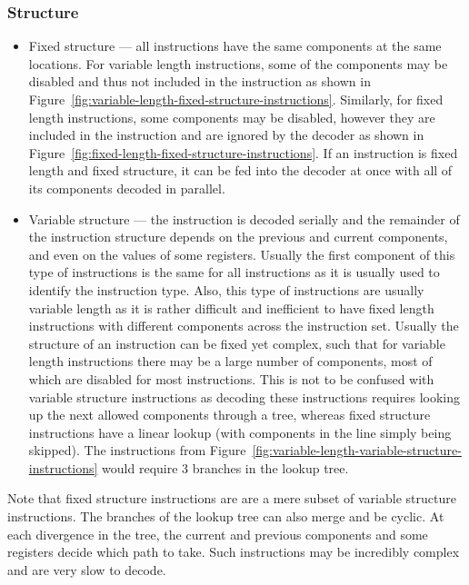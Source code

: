 \documentclass{report}
\begin{document}
\subsubsection{Structure}

\begin{itemize}
    \item{Fixed structure --- all instructions have the same components at the
        same locations. For variable length instructions, some of the
        components may be disabled and thus not included in the instruction as
        shown in Figure~\ref{fig:variable-length-fixed-structure-instructions}.
        Similarly, for fixed length instructions, some components may be
        disabled, however they are included in the instruction and are ignored
        by the decoder as shown in
        Figure~\ref{fig:fixed-length-fixed-structure-instructions}. If an
        instruction is fixed length and fixed structure, it can be fed into the
        decoder at once with all of its components decoded in parallel.}
    \item{Variable structure --- the instruction is decoded serially and the
        remainder of the instruction structure depends on the previous and
        current components, and even on the values of some registers. Usually
        the first component of this type of instructions is the same for all
        instructions as it is usually used to identify the instruction type.
        Also, this type of instructions are usually variable length as it is
        rather difficult and inefficient to have fixed length instructions with
        different components across the instruction set. Usually the structure
        of an instruction can be fixed yet complex, such that for variable
        length instructions there may be a large number of components, most of
        which are disabled for most instructions. This is not to be confused
        with variable structure instructions as decoding these instructions
        requires looking up the next allowed components through a tree, whereas
        fixed structure instructions have a linear lookup (with components in
        the line simply being skipped). The instructions from
        Figure~\ref{fig:variable-length-variable-structure-instructions} would
        require 3 branches in the lookup tree.}
\end{itemize}

Note that fixed structure instructions are are a mere subset of variable
structure instructions. The branches of the lookup tree can also merge and be
cyclic. At each divergence in the tree, the current and previous components and
some registers decide which path to take. Such instructions may be incredibly
complex and are very slow to decode.
\end{document}
